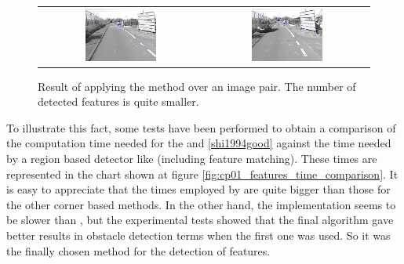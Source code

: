\begin{figure}[h!]
\begin{tabular}{cc}
\includegraphics[width=0.45\textwidth]{featuresSIFT1}\label{fig:cp01_features_sift_1} &
\includegraphics[width=0.45\textwidth]{featuresSIFT2}\label{fig:cp01_features_sift_2}
\end{tabular}
\caption{Result of applying the \cite{lowe1999object} method over an image pair. The number of detected features is quite smaller.}\label{fig:cp01_sift_features}
\end{figure}

To illustrate this fact, some tests have been performed to obtain a comparison of the computation time needed for the  \cite{harris1988combined} and \ref{shi1994good} against the time needed by a region based detector like \cite{bay2008speeded} (including feature matching). These times are represented in the chart shown at figure \ref{fig:cp01_features_time_comparison}. It is easy to appreciate that the times employed by \cite{bay2008speeded} are quite bigger than those for the other corner based methods. In the other hand, the \cite{shi1994good} implementation seems to be slower than \cite{harris1988combined}, but the experimental tests showed that the final algorithm gave better results in obstacle detection terms when the first one was used. So it was the finally chosen method for the detection of features.

